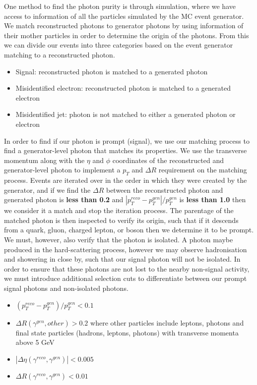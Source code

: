 One method to find the photon purity is through simulation, where we have access to information of all the particles simulated by the MC event generator. We match reconstructed photons to generator photons by using information of their mother particles in order to determine the origin of the photons. From this we can divide our events into three categories based on the event generator matching to a reconstructed photon. 

\begin{itemize}
	\item Signal: reconstructed photon is matched to a generated photon
	\item Misidentified electron: reconstructed photon is matched to a generated electron
	\item Misidentified jet: photon is not matched to either a generated photon or electron
\end{itemize}

In order to find if our photon is prompt (signal), we use our matching process to find a generator-level photon that matches its properties. We use the transverse momentum along with the $\eta$ and $\phi$ coordinates of the reconstructed and generator-level photon to implement a $p_T$ and $\Delta R$ requirement on the matching process. Events are iterated over in the order in which they were created by the generator, and if we find the $\Delta R$ between the reconstructed photon and generated photon is \textbf{less than 0.2} and $|p^{reco}_T - p^{gen}_T|/p^{gen}_T$ is \textbf{less than 1.0} then we consider it a match and stop the iteration process. The parentage of the matched photon is then inspected to verify its origin, such that if it descends from a quark, gluon, charged lepton, or boson then we determine it to be prompt. We must, however, also verify that the photon is isolated. A photon maybe produced in the hard-scattering process, however we may observe hadronisation and showering in close by, such that our signal photon will not be isolated. In order to ensure that these photons are not lost to the nearby non-signal activity, we must introduce additional selection cuts to differentiate between our prompt signal photons and non-isolated photons.  

\begin{itemize}
	\item $\left(p_T^{reco} - p_T^{gen}\right)/p_T^{gen} < 0.1$
	\item $\Delta R ( \gamma^{gen}, other ) > 0.2$ where other particles include leptons, photons and final state
particles (hadrons, leptons, photons) with transverse momenta above 5 GeV
	\item $|\Delta\eta ( \gamma^{reco}, \gamma^{gen} )| < 0.005$
	\item $\Delta R ( \gamma^{reco}, \gamma^{gen} ) < 0.01$
\end{itemize}

